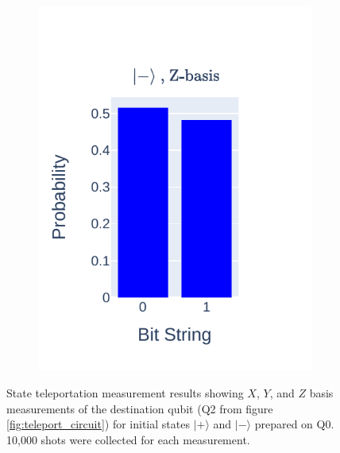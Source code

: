 \documentclass[journal]{IEEEtran}
\begin{document}
\begin{figure}
\begin{subfigure}{0.2\textwidth}
        \includegraphics[scale=0.8, trim={35 20 10 25}, clip]{figures/state_teleport/minus_z_results.pdf}
    \end{subfigure}
    \caption{State teleportation measurement results showing $X$, $Y$, and $Z$ basis measurements of the destination qubit (Q2 from figure \ref{fig:teleport_circuit}) for initial states $|+ \rangle$ and $|- \rangle$ prepared on Q0. 10,000 shots were collected for each measurement.}
    \label{fig:teleport_pm_plots}
\end{figure}
\end{document}

